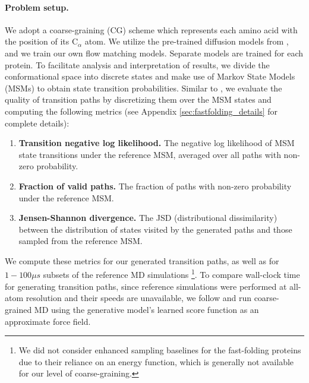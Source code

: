 \paragraph{Problem setup.} We adopt a coarse-graining (CG) scheme which represents each amino acid with the position of its C$_\alpha$ atom. We utilize the pre-trained diffusion models from \citet{arts2023two}, and we train our own flow matching models. Separate models are trained for each protein. To facilitate analysis and interpretation of results, we divide the conformational space into discrete states and make use of Markov State Models (MSMs) \cite{prinz2011markov, noe2013projected} to obtain state transition probabilities. Similar to \citet{jing2024generative}, we evaluate the quality of transition paths by discretizing them over the MSM states and computing the following metrics (see Appendix \ref{sec:fastfolding_details} for complete details):
\vspace{-7pt}
\begin{enumerate}
    \item \textbf{Transition negative log likelihood.} The negative log likelihood of MSM state transitions under the reference MSM, averaged over all paths with non-zero probability.
    \vspace{-7pt}
    \item \textbf{Fraction of valid paths.} The fraction of paths with non-zero probability under the reference MSM.
    \vspace{-7pt}
    \item \textbf{Jensen-Shannon divergence.} The JSD (distributional dissimilarity) between the distribution of states visited by the generated paths and those sampled from the reference MSM.
\end{enumerate}
We compute these metrics for our generated transition paths, as well as  for $1 - 100 \mu s$ subsets of the reference MD simulations \footnote{We did not consider enhanced sampling baselines for the fast-folding proteins due to their reliance on an energy function, which is generally not available for our level of coarse-graining.}. To compare wall-clock time for generating transition paths, since reference simulations were performed at all-atom resolution and their speeds are unavailable, we follow \citet{arts2023two} and run coarse-grained MD using the generative model's learned score function as an approximate force field.
\vspace{-7pt}
\vspace{-5pt}
